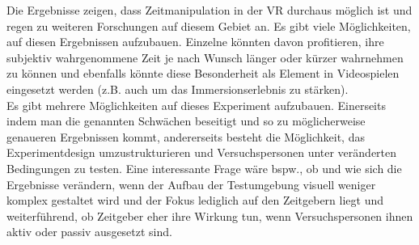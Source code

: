 \documentclass{Paper}
\begin{document}
Die Ergebnisse zeigen, dass Zeitmanipulation in der VR durchaus möglich ist und regen zu weiteren Forschungen auf diesem Gebiet an. Es gibt viele Möglichkeiten, auf diesen Ergebnissen aufzubauen.
Einzelne könnten davon profitieren, ihre subjektiv wahrgenommene Zeit je nach Wunsch länger oder kürzer wahrnehmen zu können und ebenfalls könnte diese Besonderheit als Element in Videospielen eingesetzt werden (z.B. auch um das Immersionserlebnis zu stärken).\\
Es gibt mehrere Möglichkeiten auf dieses Experiment aufzubauen. Einerseits indem man die genannten Schwächen beseitigt und so zu möglicherweise genaueren Ergebnissen kommt, andererseits besteht die Möglichkeit, das Experimentdesign umzustrukturieren und Versuchspersonen unter veränderten Bedingungen zu testen. 
Eine interessante Frage wäre bspw., ob und wie sich die Ergebnisse verändern, wenn der Aufbau der Testumgebung visuell weniger komplex gestaltet wird und der Fokus lediglich auf den Zeitgebern liegt und weiterführend, ob Zeitgeber eher ihre Wirkung tun, wenn Versuchspersonen ihnen aktiv oder passiv ausgesetzt sind.\\







\newpage

\printbibliography
\end{document}
